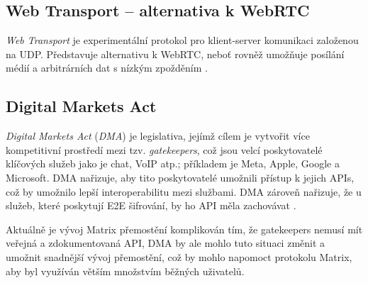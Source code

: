 \subsection{Web Transport -- alternativa k WebRTC}

\textit{Web Transport} je experimentální protokol pro klient-server komunikaci
založenou na UDP. Představuje alternativu k WebRTC, neboť rovněž umožňuje
posílání médií a arbitrárních dat s nízkým zpožděním \parencite{GitHub-WebTransport-Explainer}.

\subsection{Digital Markets Act}

\textit{Digital Markets Act} (\textit{DMA}) je legislativa, jejímž cílem je
vytvořit více kompetitivní prostředí mezi tzv. \textit{gatekeepers}, což jsou
velcí poskytovatelé klíčových služeb jako je chat, VoIP atp.; příkladem je Meta,
Apple, Google a Microsoft. DMA nařizuje, aby tito poskytovatelé umožnili přístup
k jejich APIs, což by umožnilo lepší interoperabilitu mezi službami. DMA zároveň
nařizuje, že u služeb, které poskytují E2E šifrování, by ho API měla zachovávat
\parencite{Element-AGuideToNavigateTheDMA}.

Aktuálně je vývoj Matrix přemostění komplikován tím, že gatekeepers nemusí mít
veřejná a zdokumentovaná API, DMA by ale mohlo tuto situaci změnit a umožnit
snadnější vývoj přemostění, což by mohlo napomoct protokolu Matrix, aby byl
využíván větším množstvím běžných uživatelů.
